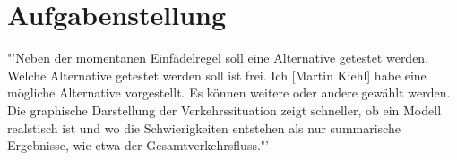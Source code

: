 \chapter{Aufgabenstellung}
"'Neben der momentanen Einfädelregel soll eine Alternative getestet werden. Welche Alternative getestet werden soll ist frei. Ich [Martin Kiehl] habe eine mögliche Alternative vorgestellt. Es können weitere oder andere gewählt werden. Die graphische Darstellung der Verkehrssituation zeigt schneller, ob ein Modell realstisch ist und wo die Schwierigkeiten entstehen als nur summarische Ergebnisse, wie etwa der Gesamtverkehrsfluss."'